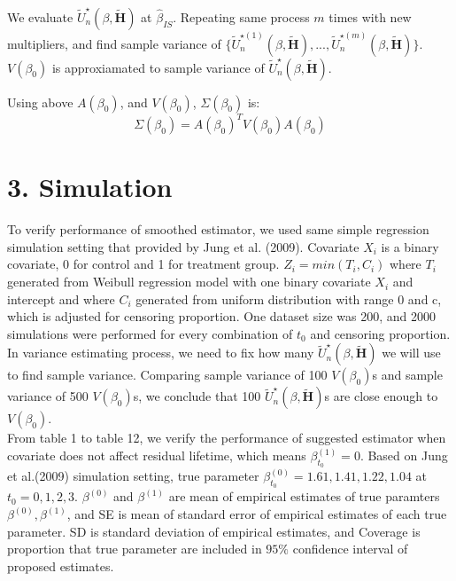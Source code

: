 \documentclass[12pt]{article}
\begin{document}
	\noindent We evaluate $\tilde{U}^{\star}_n(\beta, \tilde{\textbf{H}})$ at $\hat{\beta}_{IS}$. Repeating same process $m$ times with new multipliers, and find sample variance of $\{\tilde{U}^{\star (1)}_n(\beta, \tilde{\textbf{H}}),..., \tilde{U}^{\star (m)}_n(\beta, \tilde{\textbf{H}})\}$. $V(\beta_0)$ is approxiamated to sample variance of $\tilde{U}^{\star}_n(\beta, \tilde{\textbf{H}})$.
	
	\noindent Using above $A(\beta_0)$, and $V(\beta_0)$, $\Sigma(\beta_0)$ is:
	\begin{equation}
	\Sigma(\beta_0) = A(\beta_0)^T V(\beta_0) A(\beta_0)
	\end{equation}
	
\newpage
\section{3. Simulation}
	To verify performance of smoothed estimator, we used same simple regression simulation setting that provided by Jung et al. (2009). Covariate $X_i$ is a binary covariate, 0 for control and 1 for treatment group. $Z_i = min(T_i, C_i)$ where $T_i$ generated from Weibull regression model with one binary covariate $X_i$ and intercept and where $C_i$ generated from uniform distribution with range 0 and c, which is adjusted for censoring proportion. One dataset size was 200, and 2000 simulations were performed for every combination of $t_0$ and censoring proportion. In variance estimating process, we need to fix how many $\tilde{U}^{\star }_n(\beta, \tilde{\textbf{H}})$ we will use to find sample variance. Comparing sample variance of 100 $V(\beta_0)$s and sample variance of 500 $V(\beta_0)$s, we conclude that 100 $\tilde{U}^{\star }_n(\beta, \tilde{\textbf{H}})$s are close enough to $V(\beta_0)$.\\
	
	From table 1 to table 12, we verify the performance of suggested estimator when covariate does not affect residual lifetime, which means $\beta_{t_0}^{(1)} = 0$. Based on Jung et al.(2009) simulation setting, true parameter $\beta_{t_0}^{(0)} = 1.61, 1.41, 1.22, 1.04$ at $t_0 = 0, 1, 2, 3$. $\beta^(0)$ and $\beta^(1)$ are mean of empirical estimates of true paramters $\beta^(0), \beta^(1)$, and SE is mean of standard error of empirical estimates of each true parameter. SD is standard deviation of empirical estimates, and Coverage is proportion that true parameter are included in $95\%$ confidence interval of proposed estimates. 
	
\end{document}
